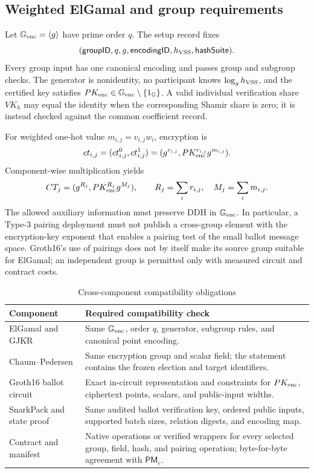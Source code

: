 \documentclass[pdflatex,sn-mathphys-num]{sn-jnl}%
\theoremstyle{thmstyleone}%
\theoremstyle{thmstyletwo}%
\theoremstyle{thmstylethree}%
\begin{document}
\subsection{Weighted ElGamal and group requirements}\label{subsec:bc-ind}
\label{subsec:semivoting-instantiation}

Let $\mathbb G_{\rm enc}=\langle g\rangle$ have prime order $q$.  The setup
record fixes
\[
 (\mathsf{groupID},q,g,\mathsf{encodingID},h_{\rm VSS},\mathsf{hashSuite}).
\]
Every group input has one canonical encoding and passes group and subgroup
checks.  The generator is nonidentity, no participant knows
$\log_g h_{\rm VSS}$, and the certified key satisfies
$PK_{\rm enc}\in\mathbb G_{\rm enc}\setminus\{1_{\mathbb G}\}$.  A valid
individual verification share $VK_h$ may equal the identity when the
corresponding Shamir share is zero; it is instead checked against the common
coefficient record.

For weighted one-hot value $m_{i,j}=v_{i,j}w_i$, encryption is
\[
 ct_{i,j}=(ct_{i,j}^0,ct_{i,j}^1)
 =(g^{r_{i,j}},PK_{\rm enc}^{r_{i,j}}g^{m_{i,j}}).
\]
Component-wise multiplication yields
\[
 CT_j=(g^{R_j},PK_{\rm enc}^{R_j}g^{M_j}),\qquad
 R_j=\sum_i r_{i,j},\quad M_j=\sum_i m_{i,j}.
\]
The allowed auxiliary information must preserve DDH in
$\mathbb G_{\rm enc}$.  In particular, a Type-3 pairing deployment must not
publish a cross-group element with the encryption-key exponent that enables a
pairing test of the small ballot message space.  Groth16's use of pairings does
not by itself make its source group suitable for ElGamal; an independent group
is permitted only with measured circuit and contract costs.

\begin{table}[htbp]
\centering
\caption{Cross-component compatibility obligations}
\label{tab:group-compatibility}
\small
\begin{tabular}{p{}p{}}
\toprule
Component & Required compatibility check \\
\midrule
ElGamal and GJKR & Same $\mathbb G_{\rm enc}$, order $q$, generator, subgroup rules, and canonical point encoding. \\
Chaum--Pedersen & Same encryption group and scalar field; the statement contains the frozen election and target identifiers. \\
Groth16 ballot circuit & Exact in-circuit representation and constraints for $PK_{\rm enc}$, ciphertext points, scalars, and public-input widths. \\
SnarkPack and state proof & Same audited ballot verification key, ordered public inputs, supported batch sizes, relation digests, and encoding map. \\
Contract and manifest & Native operations or verified wrappers for every selected group, field, hash, and pairing operation; byte-for-byte agreement with $\mathsf{PM}_e$. \\
\bottomrule
\end{tabular}
\end{table}
\end{document}
